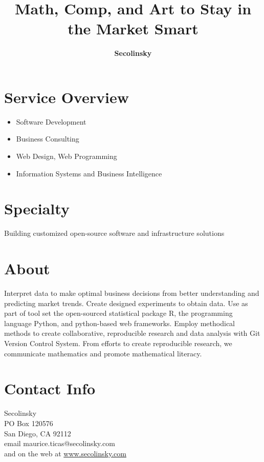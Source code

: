 \documentclass[10pt,foldmark,notumble]{leaflet}
\title{\bf Math, Comp, and Art to Stay in the Market Smart}
\author{
\Large \bf Secolinsky
}
\begin{document}
\maketitle
\section{Service Overview} 
\begin{itemize}
\item Software Development
\item Business Consulting
\item Web Design, Web Programming
\item Information Systems and Business Intelligence
\end{itemize}


\section{Specialty}
Building customized open-source software and infrastructure solutions

\section{About}
Interpret data to make optimal business decisions from better
understanding and predicting market trends.  Create designed
experiments to obtain data.  Use as part of tool set the open-sourced
statistical package R, the programming language Python, and python-based 
web frameworks.  Employ methodical methods to create collaborative,
reproducible research and data analysis with Git Version Control System.
From efforts to create reproducible research, we communicate mathematics and promote mathematical literacy.


\section{Contact Info}
Secolinsky \\
PO Box 120576 \\
San Diego, CA 92112 \\
email maurice.ticas@secolinsky.com \\
and on the web at \url{www.secolinsky.com}
\end{document}
